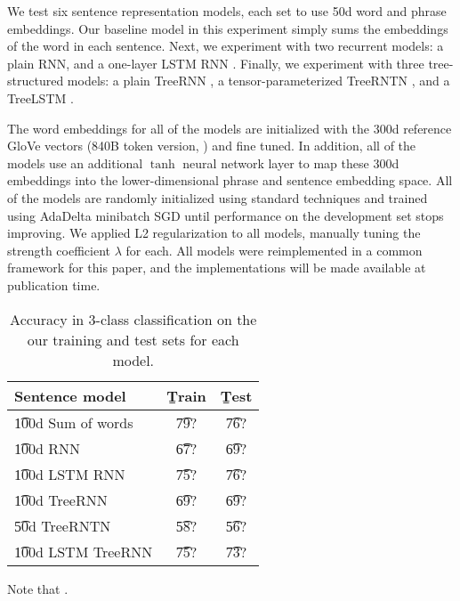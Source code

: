 We test six sentence representation models, each set to use 50d word and phrase embeddings. Our baseline model in this experiment simply sums the embeddings of the word in each sentence. Next, we experiment with two recurrent models: a plain RNN, and a one-layer LSTM RNN \cite{hochreiter1997long}. Finally, we experiment with three tree-structured models: a plain TreeRNN \cite{socher2011semi}, a tensor-parameterized TreeRNTN \cite{socher2013acl1}, and a TreeLSTM \cite{tai2015improved}.

The word embeddings for all of the models are initialized with the 300d reference GloVe vectors (840B token version, \citealt{pennington2014glove}) and fine tuned. In addition, all of the models use an additional $\tanh$ neural network layer to map these 300d embeddings into the lower-dimensional phrase and sentence embedding space. All of the models are randomly initialized using standard techniques and trained using AdaDelta \cite{zeiler2012adadelta} minibatch SGD until performance on the development set stops improving. We applied L2 regularization to all models, manually tuning the strength coefficient $\lambda$ for each. All models were reimplemented in a common framework for this paper, and the implementations will be made available at publication time.

\begin{table}
\begin{center}
\begin{tabular}{l@{\hskip \colspaceL}@{\hskip \colspaceL}c@{\hskip \colspaceL}c}
\hline
\textbf{Sentence model} & \b{Train}  & \b{Test}\\
\hline
\t{100d Sum of words}            & \t{79?} & \t{76?} \\
\t{100d RNN}            & \t{67?} & \t{69?} \\	
\t{100d LSTM RNN}            & \t{75?} & \t{76?} \\
\t{100d TreeRNN}            & \t{69?} & \t{69?} \\
\t{50d TreeRNTN}            & \t{58?} & \t{56?} \\
\t{100d LSTM TreeRNN}            & \t{75?} & \t{73?} \\
\hline
\end{tabular}
\end{center}
\caption{
\label{tab:nnresults}
Accuracy in 3-class classification on the our training and test sets for each model.
}
\end{table}

Note that .
